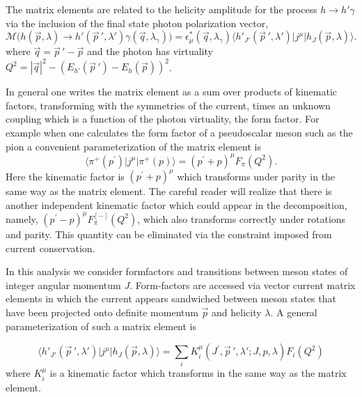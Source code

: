  The matrix elements are related to the helicity amplitude for the process $h\rightarrow h'\gamma$ via the inclusion of the final state photon polarization vector, 
 \begin{equation*}
 \mathcal{M}\Big(h(\vec{p},\lambda)\rightarrow h'(\vec{p}\,',\lambda')\gamma(\vec{q},\lambda_\gamma)\Big) = \epsilon_\mu^*(\vec{q},\lambda_\gamma)\langle h'_{J'}(\vec{p}\,',\lambda')|j^\mu | h_J(\vec{p},\lambda) \rangle.
 \end{equation*}
 where $\vec{q} = \vec{p}\,'-\vec{p}$ and the photon has virtuality $Q^2 = |\vec{q}|^2 - \left( E_{h'}(\vec{p}\,') - E_h(\vec{p})\right)^2$. 
 
 In general one writes the matrix element as a sum over products of kinematic factors, transforming with the symmetries of the current, times an unknown coupling which is a function of the photon virtuality, the form factor. For example when one calculates the form factor of a pseudoscalar meson such as the pion a convenient parameterization of the matrix element is 
\begin{equation*}
\langle \pi^+ (p^\prime) | j^\mu | \pi^+ (p) \rangle = \left( p^\prime + p\right)^\mu F_\pi(Q^2).
\end{equation*}
Here the kinematic factor is $\left( p^\prime + p\right)^\mu$ which transforms under parity in the same way as the matrix element. The careful reader will realize that there is another independent kinematic factor which could appear in the decomposition, namely, $  \left( p^\prime - p\right)^\mu F^{[-]}_\pi(Q^2) $, which also transforms correctly under rotations and parity. This quantity can be eliminated via the constraint imposed from current conservation.

In this analysis we consider formfactors and transitions between meson states of integer angular momentum $J$. Form-factors are accessed via vector current matrix elements in which the current appears sandwiched between meson states  that have been projected onto definite momentum $\vec{p}$ and helicity $\lambda$.  A general parameterization of such a matrix element is 

\begin{equation}
\langle h'_{J'}(\vec{p}\,',\lambda')|j^\mu | h_J(\vec{p},\lambda) \rangle = \sum_i K^\mu_i(J^\prime,\vec{p}\,',\lambda';J,p,\lambda)F_i(Q^2) \label{eqn::genericDecompositionHelicity}
\end{equation}
where $K^{\mu}_i$ is a kinematic factor which transforms in the same way as the matrix element. 
